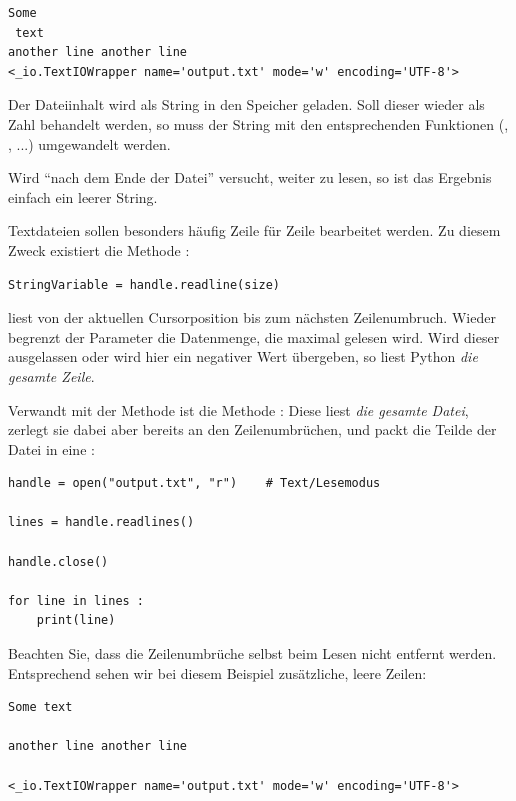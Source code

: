 \begin{cmdbox}
\begin{verbatim}
Some
 text
another line another line 
<_io.TextIOWrapper name='output.txt' mode='w' encoding='UTF-8'>
\end{verbatim}
\end{cmdbox}

Der Dateiinhalt wird als String in den Speicher geladen. Soll dieser wieder als Zahl behandelt werden, so muss der String mit den entsprechenden Funktionen (, , ...) umgewandelt werden.

Wird \enquote{nach dem Ende der Datei} versucht, weiter zu lesen, so ist das Ergebnis einfach ein leerer String.

Textdateien sollen besonders häufig Zeile für Zeile bearbeitet werden. Zu diesem Zweck existiert die Methode :
\begin{codebox}
\begin{verbatim}
StringVariable = handle.readline(size)
\end{verbatim}
\end{codebox}
 liest von der aktuellen Cursorposition bis zum nächsten Zeilenumbruch. Wieder begrenzt der Parameter  die Datenmenge, die maximal gelesen wird. Wird dieser ausgelassen oder wird hier ein negativer Wert übergeben, so liest Python \emph{die gesamte Zeile}.

Verwandt mit der Methode  ist die Methode : Diese liest \emph{die gesamte Datei}, zerlegt sie dabei aber bereits an den Zeilenumbrüchen, und packt die Teilde der Datei in eine :

\begin{codebox}
\begin{verbatim}
handle = open("output.txt", "r")    # Text/Lesemodus

lines = handle.readlines()

handle.close()

for line in lines :
    print(line)
\end{verbatim}
\end{codebox}

Beachten Sie, dass die Zeilenumbrüche selbst beim Lesen nicht entfernt werden. Entsprechend sehen wir bei diesem Beispiel zusätzliche, leere Zeilen:

\begin{cmdbox}
\begin{verbatim}
Some text

another line another line 

<_io.TextIOWrapper name='output.txt' mode='w' encoding='UTF-8'>
\end{verbatim}
\end{cmdbox}


